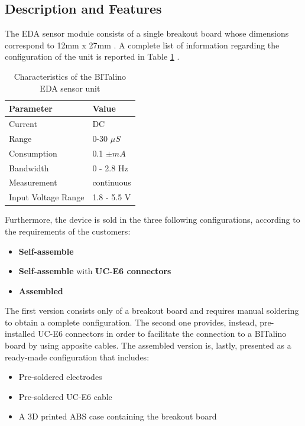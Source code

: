 \subsection{Description and Features}\label{subsec:bitalino-features}

The EDA sensor module consists of a single breakout board whose dimensions correspond to 12mm x 27mm \cite{bitalino-general}. A complete list of information regarding the configuration of the unit is reported in Table \ref{toc:bitalino-features} .

\begin{table}[H]
\centering
\begin{tabular}{ll}
    \hline
    Parameter               & Value \\
    \hline
    Current                 & DC \\
    Range                   & 0-30 $\mu S$ \\
    Consumption             & 0.1 $\pm mA$ \\
    Bandwidth               & 0 - 2.8 Hz \\
    Measurement             & continuous \\
    Input Voltage Range     & 1.8 - 5.5 V \\
    \hline
\end{tabular}
\caption{Characteristics of the BITalino EDA sensor unit}
\label{toc:bitalino-features}
\end{table}

Furthermore, the device is sold in the three following configurations, according to the requirements of the customers: 
\begin{itemize}
    \item \textbf{Self-assemble}
    \item \textbf{Self-assemble} with \textbf{UC-E6 connectors}
    \item \textbf{Assembled}
\end{itemize}

\vspace{3mm}

The first version consists only of a breakout board and requires manual soldering to obtain a complete configuration. The second one provides, instead, pre-installed UC-E6 connectors in order to facilitate the connection to a BITalino board by using apposite cables. The assembled version is, lastly, presented as a ready-made configuration that includes: 

\begin{itemize}
    \item Pre-soldered electrodes
    \item Pre-soldered UC-E6 cable
    \item A 3D printed ABS case containing the breakout board
\end{itemize}

